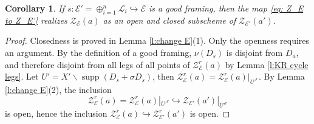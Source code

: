 \documentclass[reqno]{amsart}
\numberwithin{equation}{section}
\newcommand{\Cal}[1]{\mathcal{#1}}
\newcommand{\bs}{\backslash}
\newcommand{\inj}{\hookrightarrow}
\DeclareMathOperator{\supp}{supp}
\newcommand\op{\oplus}
\newcommand{\s}{\sigma}
\newcommand\cE{\mathcal{E}}
\newcommand\cL{\mathcal{L}}
\newcommand\cZ{\mathcal{Z}}
\newtheorem{cor}[thm]{Corollary}
\theoremstyle{remark}
\numberwithin{equation}{section}
\begin{document}
\begin{cor}\label{c:ZE open closed} If $s:\cE'=\op_{i=1}^{n}\cL_{i}\inj \cE$ is a good framing, then the map \eqref{eq: Z_E to Z_E'} realizes $\Cal{Z}_{\Cal{E}}(a)$ as an open and closed subscheme of $\Cal{Z}_{\Cal{E}'}(a')$. 
\end{cor}
\begin{proof} Closedness is proved in Lemma \ref{l:change E}(1). Only the openness requires an argument.
By the definition of a good framing, $\nu(D_{s})$ is disjoint from $D_{a}$, and therefore disjoint from all legs of all points of $\cZ^{r}_{\cE}(a)$ by Lemma \ref{l:KR cycle legs}. Let $U'=X'\bs \supp(D_{s}+\s D_{s})$, then $\cZ^{r}_{\cE}(a)=\cZ^{r}_{\cE}(a)|_{U'^{r}}$. By Lemma \ref{l:change E}(2), the inclusion
\begin{equation}
\cZ^{r}_{\cE}(a)=\cZ^{r}_{\cE}(a)|_{U'^{r}}\inj \Cal{Z}_{\Cal{E}'}(a')|_{U'^{r}}
\end{equation}
is open, hence the inclusion $\cZ^{r}_{\cE}(a)\inj \cZ^{r}_{\cE'}(a')$ is open.
\end{proof}
\end{document}
